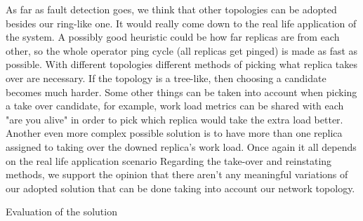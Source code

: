 \documentclass[times, 10pt,twocolumn]{article}
\begin{document}
As far as fault detection goes, we think that other topologies can be
adopted besides our ring-like one. It would really come down to the real
life application of the system. A possibly good heuristic could be how far
replicas are from each other, so the whole operator ping cycle (all
replicas get pinged) is made as fast as possible. With different
topologies different methods of picking what replica takes over are
necessary. If the topology is a tree-like, then choosing a candidate
becomes much harder. Some other things can be taken into account when
picking a take over candidate, for example, work load metrics can be
shared with each "are you alive" in order to pick which replica would take
the extra load better. Another even more complex possible solution is to
have more than one replica assigned to taking over the downed replica's
work load. Once again it all depends on the real life application scenario
Regarding the take-over and reinstating methods, we support the opinion
that there aren't any meaningful variations of our adopted solution that
can be done taking into account our network topology.

Evaluation of the solution
\end{document}
